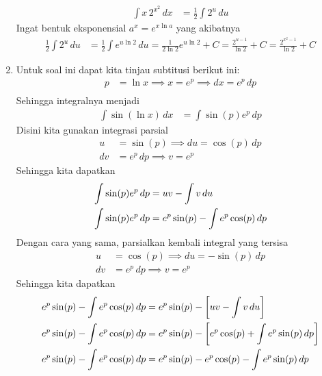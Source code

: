 \documentclass[11pt,openany,a4paper]{article}
\begin{document}
\begin{enumerate}
        \begin{align*}
          \int x \, 2^{x^2} \, dx &= \frac{1}{2}\int 2^u \, du
        \end{align*}
        Ingat bentuk eksponensial $a^x = e^{x \ln a}$ yang akibatnya
        \begin{align*}
          \frac{1}{2}\int 2^u \, du &= \frac{1}{2}\int e^{u \ln 2} \, du = \frac{1}{2\ln 2}e^{u \ln 2} + C = \frac{2^{u-1}}{\ln 2} + C = \boxed{\frac{2^{x^2 - 1}}{\ln 2} + C}
        \end{align*}
        \item Untuk soal ini dapat kita tinjau subtitusi berikut ini:
        \begin{align*}
          p &= \ln x \implies x=e^p \implies dx = e^p \, dp \\
        \end{align*}
        Sehingga integralnya menjadi
        \begin{align*}
          \int \sin(\ln x) \, dx &= \int \sin(p) e^p \, dp
        \end{align*}
        Disini kita gunakan integrasi parsial
        \begin{align*}
          u &= \sin(p) \implies du = \cos(p) \, dp \\
          dv &= e^p \, dp \implies v = e^p
        \end{align*}
        Sehingga kita dapatkan
        \begin{align}
          \int \sin(p) e^p \, dp &= uv - \int v \, du \notag\\
          \int \sin(p) e^p \, dp &= e^p \sin(p) - \int e^p \cos(p) \, dp\label{eq:int1}
        \end{align}
        Dengan cara yang sama, parsialkan kembali integral yang tersisa
        \begin{align*}
          u &= \cos(p) \implies du = -\sin(p) \, dp \\
          dv &= e^p \, dp \implies v = e^p
        \end{align*}
        Sehingga kita dapatkan
        \begin{align}
          e^p \sin(p) - \int e^p \cos(p) \, dp &=  e^p \sin(p)-\left[uv - \int v \, du \right]\notag\\
          e^p \sin(p) - \int e^p \cos(p) \, dp &= e^p \sin(p) - \left[e^p \cos(p) + \int e^p \sin(p) \, dp\right]\notag\\
          e^p \sin(p) - \int e^p \cos(p) \, dp &= e^p \sin(p) - e^p \cos(p) - \int e^p \sin(p) \, dp\label{eq:int2}

\end{align}
\end{enumerate}
\end{document}
